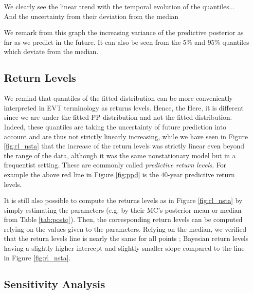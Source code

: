   We clearly see the linear trend with the temporal evolution of the quantiles...
  And the uncertainty from their deviation  from the median
  
  We remark from this graph the increasing variance of the predictive posterior as far as we predict in the future. It can also be seen from the $5\%$ and $95\%$ quantiles which deviate from the median. 
  


\subsection{Return Levels}


We remind that quantiles of the fitted distribution can be more conveniently interpreted in EVT terminology as returns levels. Hence, the  Here, it is different since we are under the fitted PP distribution and not the fitted distribution. Indeed, these quantiles are taking the uncertainty of future prediction into account and are thus not strictly linearly increasing, while we have seen in Figure \ref{fig:rl_nsta} that the increase of the return levels was strictly linear even beyond the range of the data, although it was the same nonstationary model but in a frequentist setting. These are commonly called \emph{predictive return levels}. For example the above red line in Figure \ref{fig:ppd} is the $40$-year predictive return levels.

It is still also possible to compute the returns levels as in Figure \ref{fig:rl_nsta} by simply estimating the parameters (e.g. by their MC's posterior mean or median from Table \ref{tab:postq}). Then, the corresponding return levels can be computed relying on the values given to the parameters. Relying on the median, we verified that the return levels line is nearly the same for all points ; Bayesian return levels having a slightly higher intercept and slightly smaller slope compared to the line in Figure \ref{fig:rl_nsta}. 



\subsection{Sensitivity Analysis}

